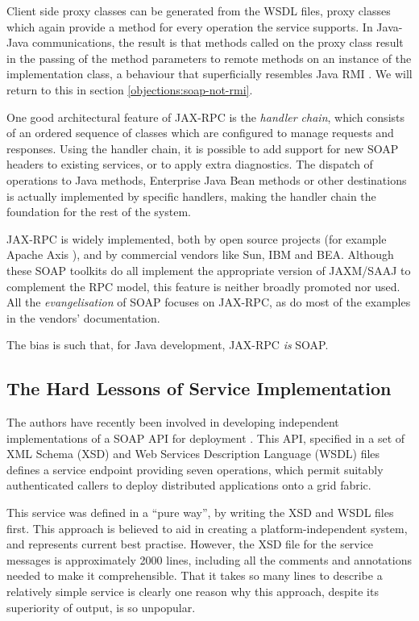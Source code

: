Client side proxy classes can be generated from the WSDL files, proxy
classes which again provide a method for every operation the service
supports. In Java-Java communications, the result is that methods
called on the proxy class result in the passing of the method
parameters to remote methods on an instance of the implementation
class, a behaviour that superficially resembles Java RMI
\cite{paper:RMI}. We will return to this in section
\ref{objections:soap-not-rmi}.

One good architectural feature of JAX-RPC is the \emph{handler chain},
which consists of an ordered sequence of classes which are configured to
manage requests and responses. Using the handler chain, it is possible
to add support for new SOAP headers to existing services, or to apply
extra diagnostics. The dispatch of operations to Java methods,
Enterprise Java Bean methods or other destinations is actually
implemented by specific handlers, making the handler chain the
foundation for the rest of the system.

JAX-RPC is widely implemented, both by open source projects (for
example Apache Axis \cite{apache:axis}), and by commercial vendors
like Sun, IBM and BEA. Although these SOAP toolkits do all implement
the appropriate version of JAXM/SAAJ to complement the RPC model, this
feature is neither broadly promoted nor used. All the
\emph{evangelisation} of SOAP focuses on JAX-RPC, as do most of the
examples in the vendors' documentation.

The bias is such that, for Java development, JAX-RPC \emph{is} SOAP. 

\subsection{The Hard Lessons of Service Implementation}
\label{intro:experience}

The authors have recently been involved in developing independent
implementations of a SOAP API for deployment \cite{draft:CDDLM}. This
API, specified in a set of XML Schema (XSD) \cite{spec:XSD} and Web
Services Description Language (WSDL) files \cite{spec:WSDL-11} defines
a service endpoint providing seven operations, which permit suitably
authenticated callers to deploy distributed applications onto a grid
fabric.

This service was defined in a ``pure way'', by writing the XSD and
WSDL files first. This approach is believed to aid in creating a
platform-independent system, and represents current best
practise. However, the XSD file for the service messages is
approximately 2000 lines, including all the comments and annotations
needed to make it comprehensible. That it takes so many lines to
describe a relatively simple service is clearly one reason why this
approach, despite its superiority of output, is so unpopular.

